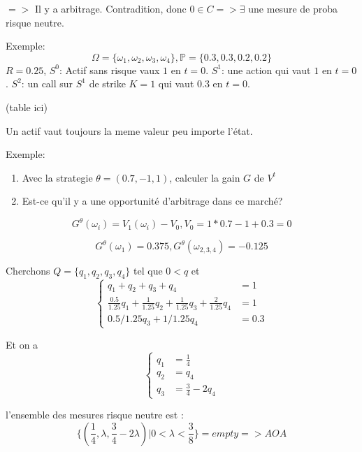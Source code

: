 \documentclass{article}
\begin{document}
$=>$ Il y a arbitrage. Contradition, donc $0\in C => \exists $ une mesure de proba risque neutre.

Exemple:
\begin{equation}
\Omega=\{\omega_1, \omega_2,\omega_3, \omega_4\}, \mathbb{P}=\{0.3, 0.3,0.2,0.2\}
\end{equation}
$R=0.25$, $S^0$: Actif sans risque vaux $1$ en $t=0$.
$S^1$: une action qui vaut $1$ en $t=0$.
$S^2$: un call sur $S^1$ de strike $K=1$ qui vaut $0.3$ en $t=0$.

(table ici)

Un actif vaut toujours la meme valeur peu importe l'\'etat.

Exemple:
\begin{enumerate}
	\item Avec la strategie $\theta=(0.7, -1, 1)$, calculer la gain $G$ de $V^t$
	\item Est-ce qu'il y a une opportunit\'e d'arbitrage dans ce march\'e?
\end{enumerate}

\begin{equation}
G^\theta(\omega_i)=V_1(\omega_i)-V_0, V_0=1*0.7-1+0.3=0
\end{equation}

\begin{equation}
G^\theta(\omega_1)=0.375, G^\theta(\omega_{2,3,4})=-0.125
\end{equation}

Cherchons $Q=\{q_1,q_2,q_3,q_4\}$ tel que $0<q$ et
\begin{equation}
\left\{ \begin{array}{rcl}
	q_1+q_2+q_3+q_4 &= 1 \\
	\frac{0.5}{1.25} q_1+\frac{1}{1.25} q_2+\frac{1}{1.25} q_3 + \frac{2}{1.25} q_4 &= 1 \\
	0.5/1.25 q_3 + 1/1.25 q_4 &=0.3
\end{array}\right.
\end{equation}

Et on a
\begin{equation}
\left\{ \begin{array}{rcl}
q_1&=\frac{1}{4} \\
q_2&=q_4 \\ 
q_3&=\frac{3}{4}-2q_4
\end{array}\right.
\end{equation}

l'ensemble des mesures risque neutre est :
\begin{equation}
\{(\frac{1}{4},\lambda,\frac{3}{4}-2\lambda)|0<\lambda<\frac{3}{8}\}=empty => AOA
\end{equation}
\end{document}
